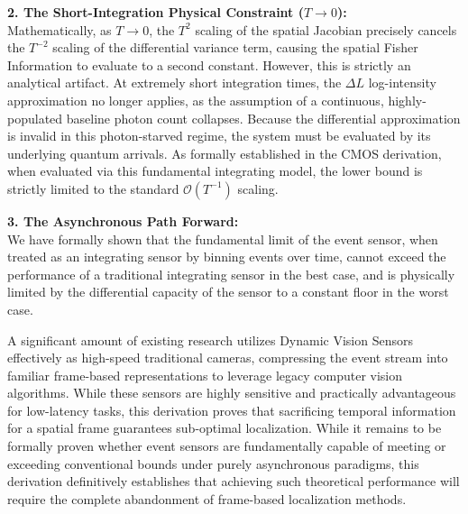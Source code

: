 \documentclass[11pt]{article}
\begin{document}
\vspace{0.5em}
\noindent \textbf{2. The Short-Integration Physical Constraint ($T \to 0$):} \\
Mathematically, as $T \to 0$, the $T^2$ scaling of the spatial Jacobian precisely cancels the $T^{-2}$ scaling of the differential variance term, causing the spatial Fisher Information to evaluate to a second constant. However, this is strictly an analytical artifact. At extremely short integration times, the $\Delta L$ log-intensity approximation no longer applies, as the assumption of a continuous, highly-populated baseline photon count collapses. Because the differential approximation is invalid in this photon-starved regime, the system must be evaluated by its underlying quantum arrivals. As formally established in the CMOS derivation, when evaluated via this fundamental integrating model, the lower bound is strictly limited to the standard $\mathcal{O}(T^{-1})$ scaling.

\vspace{0.5em}
\noindent \textbf{3. The Asynchronous Path Forward:} \\
We have formally shown that the fundamental limit of the event sensor, when treated as an integrating sensor by binning events over time, cannot exceed the performance of a traditional integrating sensor in the best case, and is physically limited by the differential capacity of the sensor to a constant floor in the worst case.

A significant amount of existing research utilizes Dynamic Vision Sensors effectively as high-speed traditional cameras, compressing the event stream into familiar frame-based representations to leverage legacy computer vision algorithms. While these sensors are highly sensitive and practically advantageous for low-latency tasks, this derivation proves that sacrificing temporal information for a spatial frame guarantees sub-optimal localization. While it remains to be formally proven whether event sensors are fundamentally capable of meeting or exceeding conventional bounds under purely asynchronous paradigms, this derivation definitively establishes that achieving such theoretical performance will require the complete abandonment of frame-based localization methods.
\end{document}

